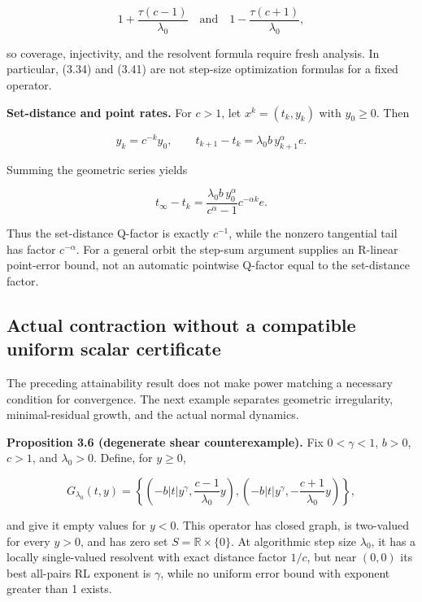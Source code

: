 \documentclass[11pt,a4paper]{article}
\theoremstyle{plain}
\theoremstyle{definition}
\theoremstyle{remark}
\begin{document}
\[
1+\frac{\tau(c-1)}{\lambda_0}
\quad\text{and}\quad
1-\frac{\tau(c+1)}{\lambda_0},
\]

so coverage, injectivity, and the resolvent formula require fresh
analysis. In particular, (3.34) and (3.41) are not step-size
optimization formulas for a fixed operator.

\textbf{Set-distance and point rates.} For \(c>1\), let
\(x^k=(t_k,y_k)\) with \(y_0\ge0\). Then

\[
y_k=c^{-k}y_0,\qquad
t_{k+1}-t_k=\lambda_0b\,y_{k+1}^\alpha e.
\]

Summing the geometric series yields

\[
t_\infty-t_k
=\frac{\lambda_0b\,y_0^\alpha}{c^\alpha-1}
c^{-\alpha k}e.
\tag{3.47}
\]

Thus the set-distance Q-factor is exactly \(c^{-1}\), while the nonzero
tangential tail has factor \(c^{-\alpha}\). For a general orbit the
step-sum argument supplies an R-linear point-error bound, not an
automatic pointwise Q-factor equal to the set-distance factor.

\hypertarget{actual-contraction-without-a-compatible-uniform-scalar-certificate}{%
\subsection{Actual contraction without a compatible uniform scalar
certificate}\label{actual-contraction-without-a-compatible-uniform-scalar-certificate}}

The preceding attainability result does not make power matching a
necessary condition for convergence. The next example separates
geometric irregularity, minimal-residual growth, and the actual normal
dynamics.

\textbf{Proposition 3.6 (degenerate shear counterexample).} Fix
\(0<\gamma<1\), \(b>0\), \(c>1\), and \(\lambda_0>0\). Define, for
\(y\ge0\),

\[
G_{\lambda_0}(t,y)=
\left\{
\left(-b|t|y^\gamma,\frac{c-1}{\lambda_0}y\right),
\left(-b|t|y^\gamma,-\frac{c+1}{\lambda_0}y\right)
\right\},
\tag{3.48}
\]

and give it empty values for \(y<0\). This operator has closed graph, is
two-valued for every \(y>0\), and has zero set
\(S=\mathbb R\times\{0\}\). At algorithmic step size \(\lambda_0\), it
has a locally single-valued resolvent with exact distance factor
\(1/c\), but near \((0,0)\) its best all-pairs RL exponent is
\(\gamma\), while no uniform error bound with exponent greater than 1
exists.
\end{document}
